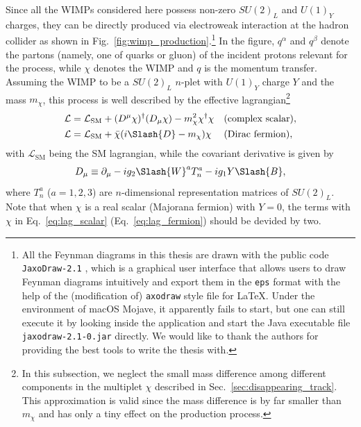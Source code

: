 \documentclass[12pt,twoside,book]{article}
\begin{document}
Since all the WIMPs considered here possess non-zero $SU(2)_L$ and $U(1)_Y$ charges, they can be directly produced via electroweak interaction at the hadron collider as shown in Fig.~\ref{fig:wimp_production}.\footnote
{
  All the Feynman diagrams in this thesis are drawn with the public code \texttt{JaxoDraw-2.1} \cite{BINOSI20091709}, which is a graphical user interface that allows users to draw Feynman diagrams intuitively and export them in the \texttt{eps} format with the help of the (modification of) \texttt{axodraw} style file for \LaTeX \cite{VERMASEREN199445}.
  Under the environment of macOS Mojave, it apparently fails to start, but one can still execute it by looking inside the application and start the Java executable file \texttt{jaxodraw-2.1-0.jar} directly.
  We would like to thank the authors for providing the best tools to write the thesis with.
}
In the figure, $q^\alpha$ and $q^\beta$ denote the partons (namely, one of quarks or gluon) of the incident protons relevant for the process, while $\chi$ denotes the WIMP and $q$ is the momentum transfer.
Assuming the WIMP to be a $SU(2)_L$ $n$-plet with $U(1)_Y$ charge $Y$ and the mass $m_\chi$, this process is well described by the effective lagrangian\footnote
{
  In this subsection, we neglect the small mass difference among different components in the multiplet $\chi$ described in Sec.~\ref{sec:disappearing_track}.
  This approximation is valid since the mass difference is by far smaller than $m_\chi$ and has only a tiny effect on the production process.
}
\begin{align}
  \mathcal{L} &= \mathcal{L}_{\mathrm{SM}} + (D^\mu \chi)^\dagger (D_\mu \chi) - m_\chi^2 \chi^\dagger \chi &
  &\text{(complex scalar)}, \label{eq:lag_scalar}\\
  \mathcal{L} &= \mathcal{L}_{\mathrm{SM}} + \bar{\chi} (i \Slash{D} - m_\chi) \chi &
  &\text{(Dirac fermion)}, \label{eq:lag_fermion}
\end{align}
with $\mathcal{L}_{\mathrm{SM}}$ being the SM lagrangian, while the covariant derivative is given by
\begin{align}
  D_\mu \equiv \partial_\mu - i g_2 \Slash{W}^a T_n^a - i g_1 Y \Slash{B},
\end{align}
where $T_n^a$ ($a=1,2,3$) are $n$-dimensional representation matrices of $SU(2)_L$.
Note that when $\chi$ is a real scalar (Majorana fermion) with $Y=0$, the terms with $\chi$ in Eq.~\eqref{eq:lag_scalar} (Eq.~\eqref{eq:lag_fermion}) should be devided by two.
\end{document}
